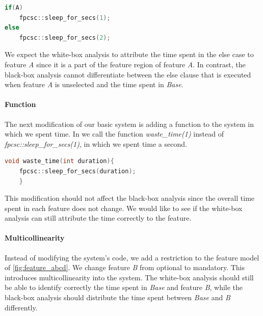 \begin{minipage}{\linewidth}
    \begin{lstlisting}[language=C++,label={lst:else_case},escapechar=|]
if(A)
    fpcsc::sleep_for_secs(1); 
else
    fpcsc::sleep_for_secs(2);
    \end{lstlisting}
    \end{minipage}

We expect the white-box analysis to attribute the time spent in the else case to feature \emph{A} 
since it is a part of the feature region of feature \emph{A}. 
In contrast, 
the black-box analysis cannot differentiate between the else clause that is executed when feature \emph{A} is unselected and the time spent in \emph{Base}.

\paragraph{Function}\label{ground-truth:Function}
The next modification of our basic system is adding a function to the system in which we spent time. 
In  we call the function \emph{waste\_time(1)} instead of \emph{fpcsc::sleep\_for\_secs(1)}, in which we spent time a second.

\begin{minipage}{\linewidth}
\begin{lstlisting}[language=C++,label={lst:function},escapechar=|]
void waste_time(int duration){
    fpcsc::sleep_for_secs(duration);
    }
\end{lstlisting}
\end{minipage}

This modification should not affect the black-box analysis since the overall time spent in each feature does not change. 
We would like to see if the white-box analysis can still attribute the time correctly to the feature.

\paragraph{Multicollinearity}\label{ground-truth:Multicollinearity}
Instead of modifying the system's code, we add a restriction to the feature model of \autoref{fig:feature_abcd}. 
We change feature \emph{B} from optional to mandatory. This introduces multicollinearity into the system. 
The white-box analysis should still be able to identify correctly the time spent in \emph{Base} and feature \emph{B}, 
while the black-box analysis should distribute the time spent between \emph{Base} and \emph{B} differently.

